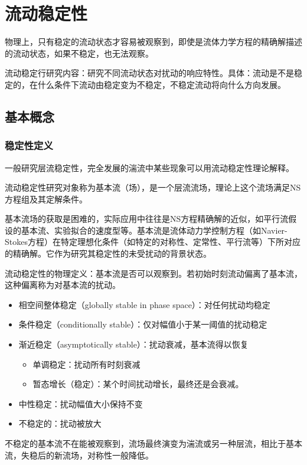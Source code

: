
\section{流动稳定性}

物理上，只有稳定的流动状态才容易被观察到，即使是流体力学方程的精确解描述的流动状态，如果不稳定，也无法观察。

流动稳定行研究内容：研究不同流动状态对扰动的响应特性。具体：流动是不是稳定的，在什么条件下流动由稳定变为不稳定，不稳定流动将向什么方向发展。

\subsection{基本概念}
\subsubsection{稳定性定义}
一般研究层流稳定性，完全发展的湍流中某些现象可以用流动稳定性理论解释。

流动稳定性研究对象称为基本流（场），是一个层流流场，理论上这个流场满足NS方程组及其定解条件。

基本流场的获取是困难的，实际应用中往往是NS方程精确解的近似，如平行流假设的基本流、实验拟合的速度型等。基本流是流体动力学控制方程（如Navier-Stokes方程）在特定理想化条件（如特定的对称性、定常性、平行流等）下所对应的精确解。它作为研究其稳定性的未受扰动的背景状态。

流动稳定性的物理定义：基本流是否可以观察到。若初始时刻流动偏离了基本流，这种偏离称为对基本流的扰动。
\begin{itemize}
    \item 相空间整体稳定（globally stable in phase space）：对任何扰动均稳定
    \item 条件稳定（conditionally stable）：仅对幅值小于某一阈值的扰动稳定
    \item 渐近稳定（asymptotically stable）：扰动衰减，基本流得以恢复
        \begin{itemize}
            \item 单调稳定：扰动所有时刻衰减
            \item 暂态增长（稳定）：某个时间扰动增长，最终还是会衰减。
        \end{itemize}
    \item 中性稳定：扰动幅值大小保持不变
    \item 不稳定的：扰动被放大
\end{itemize}
不稳定的基本流不在能被观察到，流场最终演变为湍流或另一种层流，相比于基本流，失稳后的新流场，对称性一般降低。

